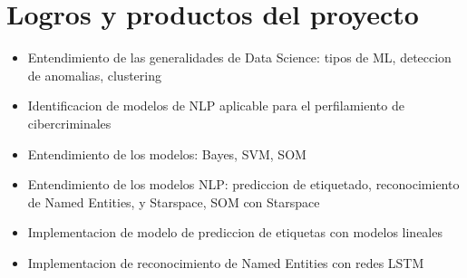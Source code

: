 \chapter{Logros y productos del proyecto} %

\label{chap:achievements} %




\begin{itemize}
\item Entendimiento de las generalidades de Data Science: tipos de ML, deteccion de anomalias, clustering
\item Identificacion de modelos de NLP aplicable para el perfilamiento de cibercriminales
\item Entendimiento de los modelos: Bayes, SVM, SOM
\item Entendimiento de los modelos NLP: prediccion de etiquetado, reconocimiento de Named Entities, y Starspace, SOM con Starspace
\item Implementacion de modelo de prediccion de etiquetas con modelos lineales 
\item Implementacion de reconocimiento de Named Entities con redes LSTM 
\end{itemize}

